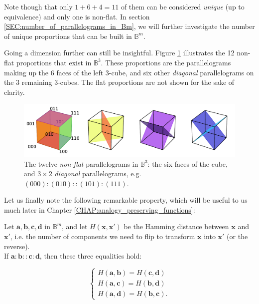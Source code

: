 Note though that only $1 + 6 + 4 = 11$ of them can be considered
\textit{unique} (up to equivalence) and only one is non-flat. In section
\ref{SEC:number_of_parallelograms_in_Bm}, we will further investigate the
number of unique proportions that can be built in $\mathbb{B}^m$.

Going a dimension further can still be insightful. Figure \ref{FIG:cubes_in_B3}
illustrates the 12 non-flat proportions that exist in $\mathbb{B}^3$. These
proportions are the parallelograms making up the 6 faces of the left $3$-cube,
and six other \textit{diagonal} parallelograms on the $3$ remaining $3$-cubes.
The flat proportions are not shown for the sake of clarity.

\begin{figure}[!h]
\centering
\includegraphics[width=\linewidth]{figures/cubes_in_B3.pdf}
  \caption{The twelve \textit{non-flat} parallelograms in $\mathbb{B}^3$: the
  six faces of the cube, and $3 \times 2$ \textit{diagonal} parallelograms,
  e.g. $(000) : (010) :: (101) : (111)$.}
\label{FIG:cubes_in_B3}
\end{figure}

Let us finally note the following remarkable property, which will be useful to
us much later in Chapter \ref{CHAP:analogy_preserving_functions}:

\begin{property}
  \label{PROPER:hamming_distance_boolean_proportion}
  Let $\mathbf{a}, \mathbf{b},\mathbf{c}, \mathbf{d}$ in $\mathbb{B}^m$, and
  let $H(\mathbf{x}, \mathbf{x'})$ be the Hamming distance between $\mathbf{x}$
  and $\mathbf{x'}$, i.e. the number of components we need to flip to transform
  $\mathbf{x}$ into $\mathbf{x'}$ (or the reverse).\\
  If $\mathbf{a} : \mathbf{b}
  :: \mathbf{c} : \mathbf{d}$, then these three equalities hold:

  $$
  \begin{cases}
    H(\mathbf{a}, \mathbf{b}) = H(\mathbf{c}, \mathbf{d})\\
    H(\mathbf{a}, \mathbf{c}) = H(\mathbf{b}, \mathbf{d})\\
    H(\mathbf{a}, \mathbf{d}) = H(\mathbf{b}, \mathbf{c}).
  \end{cases}
  $$
\end{property}

